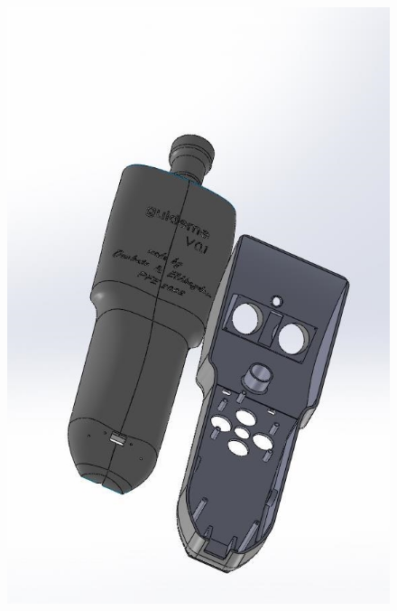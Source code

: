 \begin{figure}[!htbp]
    \centering
    \includegraphics[width=\linewidth]{assets/conception1/img348.jpg}
\end{figure}
